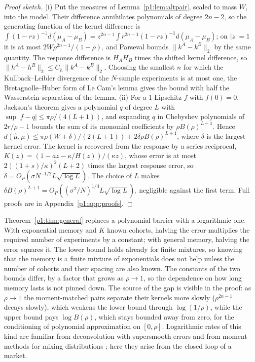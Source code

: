 \begin{proof}[Proof sketch]
(i) Put the measures of Lemma~\ref{p1:lem:altpair}, scaled to mass $W$, into the model. Their difference annihilates polynomials of degree $2n-2$, so the generating function of the kernel difference is $\int(1-rz)^{-1}d(\mu_A-\mu_B)=z^{2n-1}\int r^{2n-1}(1-rz)^{-1}d(\mu_A-\mu_B)$; on $|z|=1$ it is at most $2W\rho^{2n-1}/(1-\rho)$, and Parseval bounds $\|k^A-k^B\|_2$ by the same quantity. The response difference is $H_AH_B$ times the shifted kernel difference, so $\|h^A-h^B\|_2\le C_h\|k^A-k^B\|_2$. Choosing the smallest $n$ for which the Kullback--Leibler divergence of the $N$-sample experiments is at most one, the Bretagnolle--Huber form of Le Cam's lemma gives the bound with half the Wasserstein separation of the lemma. (ii) For a 1-Lipschitz $f$ with $f(0)=0$, Jackson's theorem gives a polynomial $q$ of degree $L$ with $\sup|f-q|\le\pi\rho/(4(L+1))$, and expanding $q$ in Chebyshev polynomials of $2r/\rho-1$ bounds the sum of its monomial coefficients by $\rho B(\rho)^{L+1}$. Hence $d(\hat\mu,\mu)\le\pi\rho(W+\delta)/(2(L+1))+2\delta\rho B(\rho)^{L+1}$, where $\delta$ is the largest kernel error. The kernel is recovered from the response by a series reciprocal, $K(z)=(1-az-\kappa/H(z))/(\kappa z)$, whose error is at most $2((1+s)/\kappa)^2(L+2)$ times the largest response error, so $\delta=O_P(\sigma N^{-1/2}L\sqrt{\log L})$. The choice of $L$ makes $\delta B(\rho)^{L+1}=O_P((\sigma^2/N)^{1/4}L\sqrt{\log L})$, negligible against the first term. Full proofs are in Appendix~\ref{p1:app:proofs}.
\end{proof}

Theorem~\ref{p1:thm:general} replaces a polynomial barrier with a logarithmic one. With exponential memory and $K$ known cohorts, halving the error multiplies the required number of experiments by a constant; with general memory, halving the error squares it. The lower bound holds already for finite mixtures, so knowing that the memory is a finite mixture of exponentials does not help unless the number of cohorts and their spacing are also known. The constants of the two bounds differ, by a factor that grows as $\rho\to1$, so the dependence on how long memory lasts is not pinned down. The source of the gap is visible in the proof: as $\rho\to1$ the moment-matched pairs separate their kernels more slowly ($\rho^{2n-1}$ decays slowly), which weakens the lower bound through $\log(1/\rho)$, while the upper bound pays $\log B(\rho)$, which stays bounded away from zero, for the conditioning of polynomial approximation on $[0,\rho]$. Logarithmic rates of this kind are familiar from deconvolution with supersmooth errors \citep{p1:fan1991} and from moment methods for mixing distributions \citep{p1:kong2017,p1:wu2020}; here they arise from the closed loop of a market.

